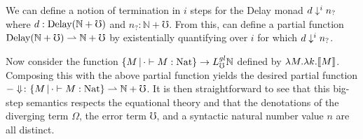 We can define a notion of termination in $i$ steps for the Delay monad $d \downarrow^i
n_?$ where $d : \text{Delay}(\mathbb{N} + {\mho})$ and $n_? : \mathbb{N} + {\mho}$. From
this, can define a partial function $\text{Delay} (\mathbb{N} + {\mho})
\rightharpoonup \mathbb{N} + {\mho}$ by existentially quantifying over $i$
for which $d \downarrow^i n_?$.

Now consider the function $\{M \,|\, \cdot \vdash M : \text{Nat} \} \to L_\mho^{gl}
\mathbb{N}$ defined by $\lambda M. \lambda k .\llbracket {M} \rrbracket$. Composing this with the
above partial function yields the desired partial function $-\Downarrow \colon \{M
\,|\, \cdot \vdash M : \text{Nat} \} \rightharpoonup \mathbb{N} + {\mho}$. It is
then straightforward to see that this big-step semantics respects the equational
theory and that the denotations of the diverging term $\Omega$, the error term
$\mho$, and a syntactic natural number value $n$ are all distinct.
